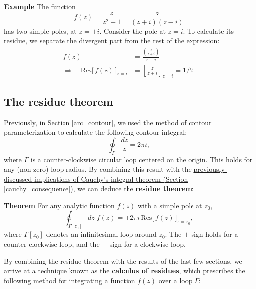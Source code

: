 \documentclass[10pt,a4paper]{article}
\begin{document}
\begin{framed}
\noindent
\underline{\textbf{Example}}
\vskip 0.02in \noindent
The function 
\begin{equation}
  f(z) = \frac{z}{z^2 + 1} = \frac{z}{(z+i)(z-i)}
\end{equation}
has two simple poles, at $z = \pm i$. Consider the pole at $z = i$. To
calculate its residue, we separate the divergent part from the rest of
the expression:
\begin{align}
  f(z) &= \frac{\left(\frac{z}{z+i}\right)}{z-i} \\
  \Rightarrow\quad \mathrm{Res}\big[\,f(z)\,\big]_{z=i}
  &= \left[\frac{z}{z+i}\right]_{z=i} = 1/2.
\end{align}
\end{framed}

\subsection{The residue theorem}
\label{residue_theorem}

\hyperref[arc_contour]{Previously, in Section \ref{arc_contour}}, we
used the method of contour parameterization to calculate the following
contour integral:
\begin{equation}
  \oint_{\Gamma} \frac{dz}{z} = 2\pi i,
\end{equation}
where $\Gamma$ is a counter-clockwise circular loop centered on the
origin. This holds for any (non-zero) loop radius. By combining this
result with the \hyperref[cauchy_consequence]{previously-discussed
  implications of Cauchy's integral theorem (Section
  \ref{cauchy_consequence})}, we can deduce the \textbf{residue
  theorem}:

\begin{framed}
\noindent
\underline{\textbf{Theorem}}
\vskip 0.02in \noindent
For any analytic function $f(z)$ with a simple pole at $z_0$,
\begin{equation}
  \oint_{\Gamma[z_0]} dz \; f(z) = \pm 2\pi i \, \mathrm{Res}\big[\,f(z)\,\big]_{z = z_0},  
\end{equation}
where $\Gamma[z_0]$ denotes an infinitesimal loop around $z_0$.  The
$+$ sign holds for a counter-clockwise loop, and the $-$ sign for a
clockwise loop.
\end{framed}

By combining the residue theorem with the results of the last few
sections, we arrive at a technique known as the \textbf{calculus of
  residues}, which prescribes the following method for integrating a
function $f(z)$ over a loop $\Gamma$:
\end{document}
